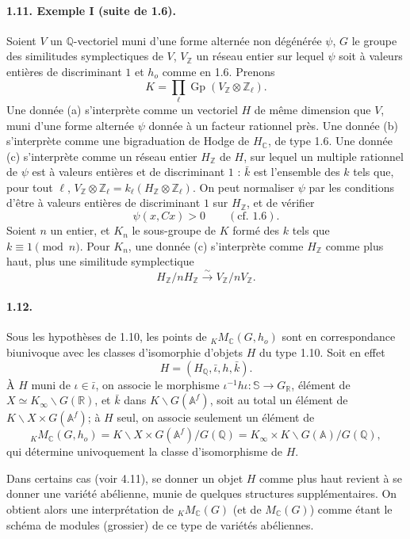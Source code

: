 \documentclass[10pt]{article}
\newcommand{\A}{\mathbb A}
\newcommand{\Af}{\mathbb A^f}
\newcommand{\C}{\mathbb C}
\newcommand{\Q}{\mathbb Q}
\newcommand{\R}{\mathbb R}
\newcommand{\Z}{\mathbb Z}
\newcommand{\bS}{\mathbb S}
\newcommand{\Gp}{\operatorname{Gp}}
\newcommand{\MC}{M_{\C}}
\begin{document}
\paragraph{1.11. Exemple I (suite de 1.6).} Soient $V$ un $\Q$-vectoriel muni d'une forme alternée non dégénérée $\psi$, $G$ le groupe des similitudes symplectiques de $V$, $V_\Z$ un réseau entier sur lequel $\psi$ soit à valeurs entières de discriminant $1$ et $h_o$ comme en 1.6. Prenons
\[
K=\prod_\ell \Gp(V_\Z\otimes\Z_\ell).
\]
Une donnée (a) s'interprète comme un vectoriel $H$ de même dimension que $V$, muni d'une forme alternée $\psi$ donnée à un facteur rationnel près. Une donnée (b) s'interprète comme une bigraduation de Hodge de $H_\C$, de type 1.6. Une donnée (c) s'interprète comme un réseau entier $H_\Z$ de $H$, sur lequel un multiple rationnel de $\psi$ est à valeurs entières et de discriminant $1$ : $\bar k$ est l'ensemble des $k$ tels que, pour tout $\ell$, $V_\Z\otimes\Z_\ell=k_\ell(H_\Z\otimes\Z_\ell)$. On peut normaliser $\psi$ par les conditions d'être à valeurs entières de discriminant $1$ sur $H_\Z$, et de vérifier
\[
\psi(x,Cx)>0 \qquad (\text{cf. }1.6).
\]
Soient $n$ un entier, et $K_n$ le sous-groupe de $K$ formé des $k$ tels que $k\equiv1\pmod n$. Pour $K_n$, une donnée (c) s'interprète comme $H_\Z$ comme plus haut, plus une similitude symplectique
\[
H_\Z/nH_\Z\xrightarrow{\sim}V_\Z/nV_\Z.
\]

\paragraph{1.12.} Sous les hypothèses de 1.10, les points de ${}_K\MC(G,h_o)$ sont en correspondance biunivoque avec les classes d'isomorphie d'objets $H$ du type 1.10. Soit en effet
\[
H=(H_\Q,\bar\iota,h,\bar k).
\]
À $H$ muni de $\iota\in\bar\iota$, on associe le morphisme $\iota^{-1}h\iota:\bS\to G_\R$, élément de $X\simeq K_\infty\backslash G(\R)$, et $\bar k$ dans $K\backslash G(\Af)$, soit au total un élément de $K\backslash X\times G(\Af)$; à $H$ seul, on associe seulement un élément de
\[
{}_K\MC(G,h_o)=K\backslash X\times G(\Af)/G(\Q)=K_\infty\times K\backslash G(\A)/G(\Q),
\]
qui détermine univoquement la classe d'isomorphisme de $H$.

Dans certains cas (voir 4.11), se donner un objet $H$ comme plus haut revient à se donner une variété abélienne, munie de quelques structures supplémentaires. On obtient alors une interprétation de ${}_K\MC(G)$ (et de $\MC(G)$) comme étant le schéma de modules (grossier) de ce type de variétés abéliennes.
\end{document}

